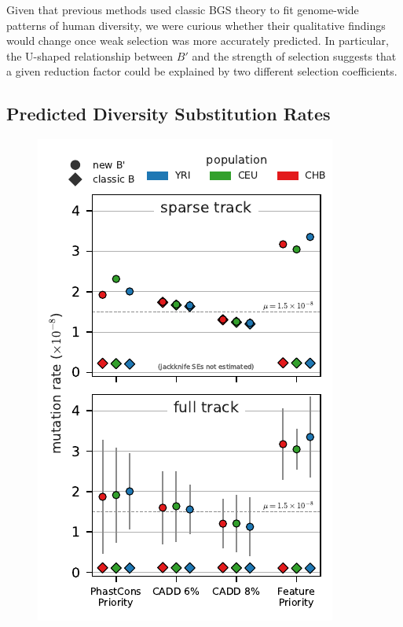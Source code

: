 \documentclass[11pt]{article}
\begin{document}
Given that previous methods used classic BGS theory to fit genome-wide patterns
of human diversity, we were curious whether their qualitative findings would
change once weak selection was more accurately predicted. In particular, the
U-shaped relationship between $B'$ and the strength of selection suggests that
a given reduction factor could be explained by two different selection
coefficients.

\subsection*{Predicted Diversity Substitution Rates}

\begin{figure}[htbp] \centering
    \includegraphics[width=\textwidth]{figures/figure_5.pdf} 
    \caption{}
  \label{fig:figure-4}
\end{figure}
\end{document}
